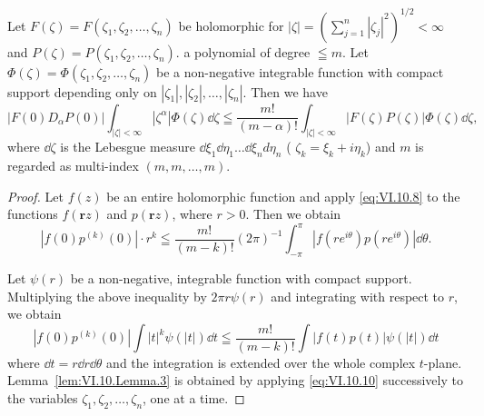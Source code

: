 \begin{lemma}\label{lem:VI.10.Lemma.3} Let $F(\zeta) = F(\zeta_1, \zeta_2, \ldots, \zeta_n)$ be holomorphic for $|\zeta| = \left(\sum\limits_{j=1}^{n} |\zeta_j|^2\right)^{1/2} < \infty$ and $P(\zeta) = P(\zeta_1, \zeta_2, \ldots, \zeta_n)$. a polynomial of degree $\leqq m$. Let $\Phi(\zeta) = \Phi(\zeta_1, \zeta_2, \ldots, \zeta_n)$ be a non-negative integrable function with compact support depending only on $|\zeta_1|, |\zeta_2|, \ldots, |\zeta_n|$. Then we have 
\begin{equation}\label{eq:VI.10.9}
\left| F (0) D _{\alpha} P (0) \right| \int_{| \zeta | < \infty} \left| \zeta^{\alpha} \right| \Phi (\zeta) \dd \zeta \leqq \frac {m !}{(m - \alpha) !} \int_{| \zeta | < \infty} \left| F (\zeta) P (\zeta) \right| \Phi (\zeta) \dd \zeta ,
\end{equation}
where $\dd\zeta$ is the Lebesgue measure $\dd\xi_1\dd\eta_1\ldots \dd\xi_nd\eta_n$ ( $\zeta_k = \xi_k + i\eta_k$) and $m$ is regarded as multi-index $(m, m, \ldots, m)$. 
\end{lemma}

\begin{proof}
 Let $f(z)$ be an entire holomorphic function and apply \eqref{eq:VI.10.8} to the functions $f(\mathbf{r}z)$ and $p(\mathbf{r}z)$, where $r > 0$. Then we obtain 
\[
\left| f (0) p ^{(k)} (0) \right| \cdot r ^{k} \leqq \frac {m !}{(m - k) !} (2 \pi) ^{-1} \int_{- \pi} ^{\pi} \left| f (r e ^{i \theta}) p (r e ^{i \theta}) \right| \dd \theta . \]

Let $\psi(r)$ be a non-negative, integrable function with compact support. Multiplying the above inequality by $2\pi r\psi(r)$ and integrating with respect to $r$, we obtain 
\begin{equation}\label{eq:VI.10.10}
\left| f (0) p ^{(k)} (0) \right| \int | t | ^{k} \psi (| t |) \dd t \leqq \frac {m !}{(m - k) !} \int | f (t) p (t) | \psi (| t |) \dd t
\end{equation}
where $\dd t = r \dd r \dd\theta$ and the integration is extended over the whole complex $t$-plane. Lemma~\ref{lem:VI.10.Lemma.3} is obtained by applying \eqref{eq:VI.10.10} successively to the variables $\zeta_{1}, \zeta_{2}, \ldots, \zeta_{n}$, one at a time. 
\end{proof}

